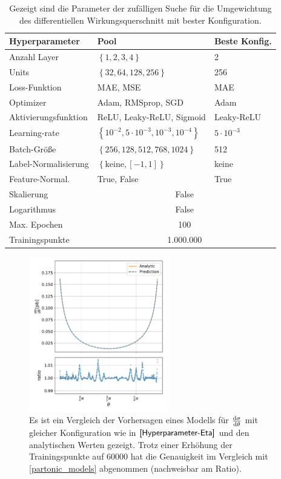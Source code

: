 \begin{table}
	\centering
	\caption{Gezeigt sind die Parameter der zufälligen Suche für die Umgewichtung des differentiellen Wirkungsquerschnitt mit bester Konfiguration.}
	\begin{tabular}{lll}
		Hyperparameter & Pool & Beste Konfig. \\
		\hline\hline
		Anzahl Layer & $\left\lbrace 1,2,3,4\right\rbrace$ & 2 \\
		Units &$\left\lbrace 32, 64, 128, 256\right\rbrace$ & 256 \\
		Loss-Funktion & MAE, MSE & MAE \\
		Optimizer & Adam, RMSprop, SGD  & Adam\\
		Aktivierungsfunktion & ReLU, Leaky-ReLU, Sigmoid & Leaky-ReLU \\
		Learning-rate & $\left\lbrace 10^{-2}, 5 \cdot 10^{-3}, 10^{-3}, 10^{-4} \right\rbrace $ & $5 \cdot 10^{-3}$\\
		Batch-Größe & $\left\lbrace 256, 128, 512, 768, 1024 \right\rbrace $ & 512\\
		Label-Normalisierung & $\left\lbrace \text{keine}, [-1,1]\right\rbrace $ & keine\\
		Feature-Normal. & True, False & True \\
		\hline
		Skalierung & \multicolumn{2}{c}{False} \\
		Logarithmus & \multicolumn{2}{c}{False} \\ 
		Max. Epochen & \multicolumn{2}{c}{100}\\
		Trainingspunkte & \multicolumn{2}{c}{1.000.000} \\
		\hline
	\end{tabular}
	\label{hyperparameter-reweighting}
\end{table}
\begin{figure}
	\captionsetup{
		format=plain,
		margin=0.5em,
		labelsep=newline,
		justification=justified,
		singlelinecheck=false
	}
	\centering
	\includegraphics[width=6cm]{graphics/2.2}
	\caption{Es ist ein Vergleich der Vorhersagen eines Modells für $\derivative{\sigma}{\theta}$ mit gleicher Konfiguration wie in $\textsf{\autoref{Hyperparameter-Eta}}$ und den analytischen Werten gezeigt. Trotz einer Erhöhung der Trainingspunkte auf 60000 hat die Genauigkeit im Vergleich mit \textsf{\autoref{partonic_models}} abgenommen (nachweisbar am Ratio).}
	\label{theta-bad-config}
\end{figure}

